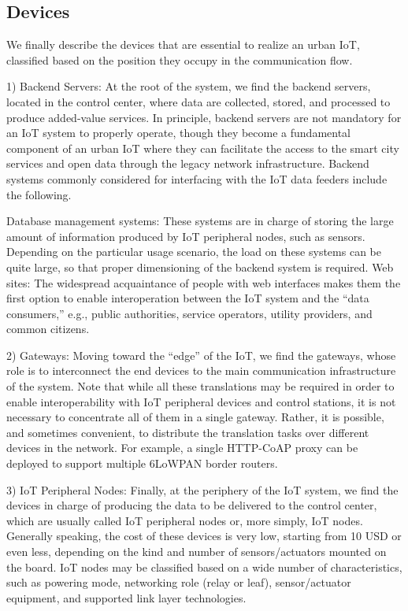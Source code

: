 \documentclass[conference]{IEEEtran}
\begin{document}
	\subsection{Devices}We finally describe the devices that are essential to realize an urban IoT, classified based on the position they occupy in the communication flow.
	
	1) Backend Servers: At the root of the system, we find the backend servers, located in the control center, where data are collected, stored, and processed to produce added-value services. In principle, backend servers are not mandatory for an IoT system to properly operate, though they become a fundamental component of an urban IoT where they can facilitate the access to
	the smart city services and open data through the legacy network infrastructure. Backend systems commonly considered for interfacing with the IoT data feeders include the following.
	
	Database management systems: These systems are in
	charge of storing the large amount of information produced by IoT peripheral nodes, such as sensors. Depending on the particular usage scenario, the load on these systems can be quite large, so that proper dimensioning of the backend system is required.
	Web sites: The widespread acquaintance of people with web interfaces makes them the first option to enable interoperation between the IoT system and the “data consumers,” e.g., public authorities, service operators, utility providers, and common
	citizens.
	
	2) Gateways: Moving toward the “edge” of the IoT, we find the gateways, whose role is to interconnect the end devices to the main communication infrastructure of the system. Note that while all these translations may be required in order to enable interoperability with IoT peripheral devices and control stations, it is not necessary to concentrate all of them in a single
	gateway. Rather, it is possible, and sometimes convenient, to distribute the translation tasks over different devices in the network. For example, a single HTTP-CoAP proxy can be deployed to support multiple 6LoWPAN border routers.
	
	3) IoT Peripheral Nodes: Finally, at the periphery of the IoT system, we find the devices in charge of producing the data to be delivered to the control center, which are usually called IoT peripheral nodes or, more simply, IoT nodes. Generally speaking, the cost of these devices is very low, starting from
	10 USD or even less, depending on the kind and number of sensors/actuators mounted on the board. IoT nodes may be classified based on a wide number of characteristics, such as powering mode, networking role (relay or leaf), sensor/actuator equipment, and supported link layer technologies.
	
\end{document}
